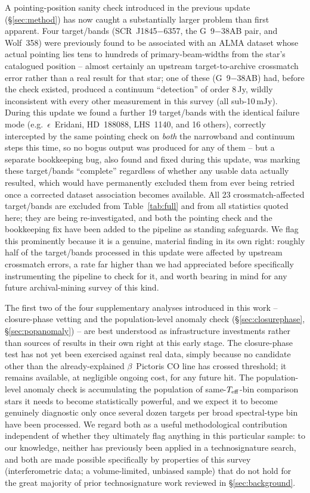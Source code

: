 \documentclass{openjournal}
\begin{document}
A pointing-position sanity check introduced in the previous update
(\S\ref{sec:method}) has now caught a substantially larger problem than
first apparent. Four target/bands (SCR~J1845$-$6357, the G~9$-$38AB
pair, and Wolf~358) were previously found to be associated with an ALMA
dataset whose actual pointing lies tens to hundreds of primary-beam-widths
from the star's catalogued position -- almost certainly an upstream
target-to-archive crossmatch error rather than a real result for that
star; one of these (G~9$-$38AB) had, before the check existed, produced
a continuum ``detection'' of order 8\,Jy, wildly inconsistent with every
other measurement in this survey (all sub-10\,mJy). During this update we
found a further 19 target/bands with the identical failure mode (e.g.\
$\epsilon$~Eridani, HD~188088, LHS~1140, and 16 others), correctly
intercepted by the same pointing check on \emph{both} the narrowband and
continuum steps this time, so no bogus output was produced for any of
them -- but a separate bookkeeping bug, also found and fixed during this
update, was marking these target/bands ``complete'' regardless of
whether any usable data actually resulted, which would have permanently
excluded them from ever being retried once a corrected dataset
association becomes available. All 23 crossmatch-affected target/bands
are excluded from Table~\ref{tab:full} and from all statistics quoted
here; they are being re-investigated, and both the pointing check and the
bookkeeping fix have been added to the pipeline as standing safeguards.
We flag this prominently because it is a genuine, material finding in
its own right: roughly half of the target/bands processed in this update
were affected by upstream crossmatch errors, a rate far higher than we
had appreciated before specifically instrumenting the pipeline to check
for it, and worth bearing in mind for any future archival-mining survey
of this kind.

The first two of the four supplementary analyses introduced in this work
-- closure-phase vetting and the population-level anomaly check
(\S\ref{sec:closurephase}, \S\ref{sec:popanomaly}) -- are best understood
as infrastructure investments rather than sources of results in their
own right at this early stage. The closure-phase test has not yet been
exercised against real data, simply because no candidate other than the
already-explained $\beta$~Pictoris CO line has crossed threshold; it
remains available, at negligible ongoing cost, for any future hit. The
population-level anomaly check is accumulating the population of
same-$T_{\rm eff}$-bin comparison stars it needs to become statistically
powerful, and we expect it to become genuinely diagnostic only once
several dozen targets per broad spectral-type bin have been processed.
We regard both as a useful methodological contribution independent of
whether they ultimately flag anything in this particular sample: to our
knowledge, neither has previously been applied in a technosignature
search, and both are made possible specifically by properties of this
survey (interferometric data; a volume-limited, unbiased sample) that do
not hold for the great majority of prior technosignature work reviewed in
\S\ref{sec:background}.
\end{document}

